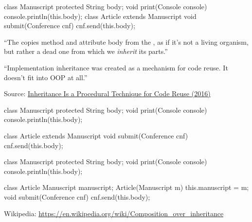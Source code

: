 \documentclass{article}
\begin{document}
\begin{multicols}{2}
{\small\begin{ffcode}
class Manuscript {
  protected String body;
  void print(Console console) {
    console.println(this.body);
  }
}
class Article
  extends Manuscript {
  void submit(Conference cnf) {
    cnf.send(this.body);
  }
}
\end{ffcode}
}
\par\columnbreak\par
``The  copies method  and attribute body from the , as if it’s not a living organism, but rather a dead one from which we \emph{inherit} its parts.''\par
``Implementation inheritance was created as a mechanism for code reuse. It doesn't fit into OOP at all.''\par
{\scriptsize Source: \href{https://www.yegor256.com/2016/09/13/inheritance-is-procedural.html}{Inheritance Is a Procedural Technique for Code Reuse (2016)}\par}
\end{multicols}
\plush{}

\begin{multicols}{2}
{\small\begin{ffcode}
class Manuscript
  protected String body;
  void print(Console console)
    console.println(this.body);

class Article
  extends Manuscript
  void submit(Conference cnf)
    cnf.send(this.body);
\end{ffcode}
}
\par\columnbreak\par
{\small\begin{ffcode}
class Manuscript
  protected String body;
  void print(Console console)
    console.println(this.body);

class Article
  Manuscript manuscript;
  Article(Manuscript m)
    this.manuscript = m;
  void submit(Conference cnf)
    cnf.send(this.body);
\end{ffcode}
}
\end{multicols}\par
{\scriptsize Wikipedia: \url{https://en.wikipedia.org/wiki/Composition_over_inheritance}\par}
\plush{}

\end{document}
